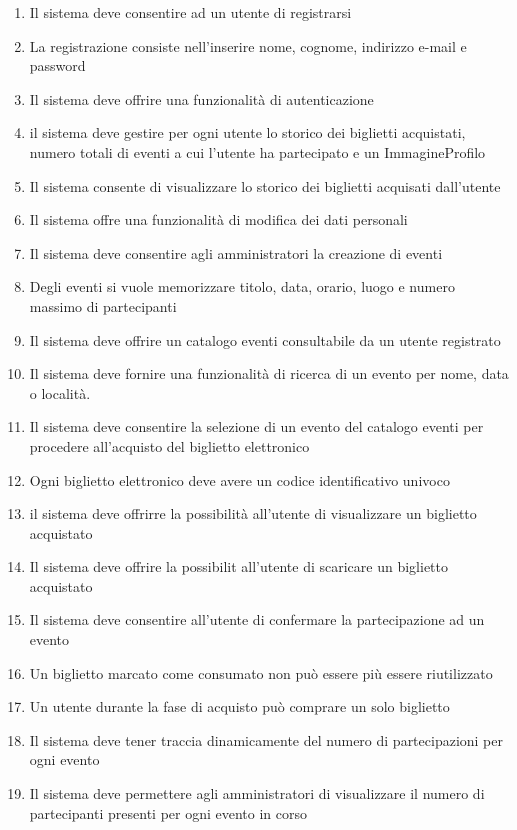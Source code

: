 \begin{enumerate}[]
    \item Il sistema deve consentire ad un utente di registrarsi
    \item La registrazione consiste nell’inserire nome, cognome, indirizzo e-mail e password
    \item Il sistema deve offrire una funzionalità di autenticazione
    \item il sistema deve gestire per ogni utente lo storico dei biglietti acquistati, numero totali di eventi a cui l’utente ha partecipato e un ImmagineProfilo
    \item Il sistema consente di visualizzare lo storico dei biglietti acquisati dall'utente
    \item Il sistema offre una funzionalità di modifica dei dati personali
    \item Il sistema deve consentire agli amministratori la creazione di eventi
    \item Degli eventi si vuole memorizzare titolo, data, orario, luogo e numero massimo di partecipanti
    \item Il sistema deve offrire un catalogo eventi consultabile da un utente registrato
    \item Il sistema deve fornire una funzionalità di ricerca di un evento per nome, data o località.
    \item Il sistema deve consentire la selezione di un evento del catalogo eventi per procedere all’acquisto del biglietto elettronico
    \item Ogni biglietto elettronico deve avere un codice identificativo univoco
    \item il sistema deve offrirre la possibilità all'utente di visualizzare un biglietto acquistato
    \item Il sistema deve offrire la possibilit all'utente di scaricare un biglietto acquistato
    \item Il sistema deve consentire all’utente di confermare la partecipazione ad un evento
    \item Un biglietto marcato come consumato non può essere più essere riutilizzato
    \item Un utente durante la fase di acquisto può comprare un solo biglietto
    \item Il sistema deve tener traccia dinamicamente del numero di partecipazioni per ogni evento
    \item Il sistema deve permettere agli amministratori di visualizzare il numero di partecipanti presenti per ogni evento in corso

\end{enumerate}
